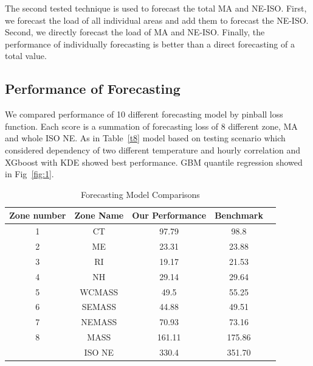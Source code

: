 \documentclass[journal]{IEEEtran} %
\begin{document}
The second tested technique is used to forecast the total MA and NE-ISO. First, we forecast the load of all individual areas and add them to forecast the NE-ISO. Second, we directly forecast the load of MA and NE-ISO. Finally, the performance of individually forecasting is better than a direct forecasting of a total value.






\subsection{Performance of Forecasting}

 We compared performance of 10 different forecasting model by pinball loss function. Each score is a summation of forecasting loss of 8 different zone, MA and whole ISO NE. As in Table~\ref{t8} model based on testing scenario which considered dependency of two different temperature and hourly correlation and XGboost with KDE showed best performance. GBM quantile regression showed in Fig~\ref{fig:1}.






















\begin{table}[!t]
	\center
	\renewcommand{\arraystretch}{1.2}
	\caption{Forecasting Model Comparisons}
	\label{Ranking}
	\begin{tabular}{| c | c | c | c | c | }
		\hline
		Zone number& Zone Name    & Our Performance  & Benchmark    \\  \hline
		1 & CT	& 97.79 & 98.8     \\ \hline
		2 & ME & 23.31  & 23.88      \\ \hline
		3 & RI & 19.17 & 21.53     \\ \hline
		4 & NH & 29.14 & 29.64      \\ \hline
		5 & WCMASS & 49.5  & 55.25     \\ \hline
		6 & SEMASS & 44.88 & 49.51      \\ \hline
		7 & NEMASS & 70.93 & 73.16     \\ \hline
		8 & MASS & 161.11 & 175.86      \\ \hline
		&ISO NE & 330.4 & 351.70      \\ \hline
	\end{tabular}
\end{table}
\end{document}
